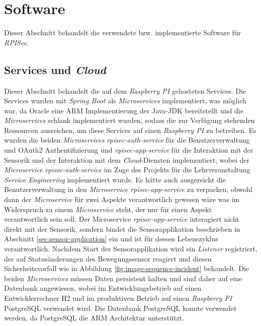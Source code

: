 \documentclass[]{article}
\begin{document}
\section{Software}
Dieser Abschnitt behandelt die verwendete bzw. implementierte Software für \emph{RPISec}.
\subsection{Services und \emph{Cloud}}
Dieser Abschnitt behandelt die auf dem \emph{Raspberry PI} gehosteten Services. Die Services wurden mit \emph{Spring Boot} als \emph{Microservices} implementiert, was möglich war, da Oracle eine ARM Implementierung der Java-JDK bereitstellt und die \emph{Microservices} schlank implementiert wurden, sodass die zur Verfügung stehenden Ressourcen ausreichen, um diese Services auf einen \emph{Raspberry PI} zu betreiben.
\newline
\newline
Es wurden die beiden \emph{Microservices} \emph{rpisec-auth-service} für die Benutzerverwaltung und OAuth2 Authentifizierung und \emph{rpisec-app-service} für die Interaktion mit der Sensorik und der Interaktion mit dem \emph{Cloud}-Diensten implementiert, wobei der \emph{Microservice} \emph{rpisec-auth-service} im Zuge des Projekts für die Lehrveranstaltung \emph{Service Engineering} implementiert wurde. Es hätte auch ausgereicht die Benutzerverwaltung in den \emph{Microservice rpisec-app-service} zu verpacken, obwohl dann der \emph{Microservice} für zwei Aspekte verantwortlich gewesen wäre was im Widerspruch zu einem \emph{Microservice} steht, der nur für einen Aspekt verantwortlich sein soll. 
\newline
\newline
Der Microservice \emph{rpisec-app-service} interagiert nicht direkt mit der Sensorik, sondern bindet die Sensorapplikation beschrieben in Abschnitt \ref{sec:sensor-application} ein und ist für dessen Lebenszyklus verantwortlich. Nachdem Start der Sensorapplikation wird ein \emph{Listener} registriert, der auf Statusänderungen des Bewegungssensor reagiert und diesen Sicherheitsvorfall wie in Abbildung \ref{fig:image-sequence-incident} behandelt.
\newline
\newline
Die beiden \emph{Microservices} müssen Daten persistent halten und sind daher auf eine Datenbank angewiesen, wobei im Entwicklungsbetrieb auf einen Entwicklerrechner H2 und im produktiven Betrieb auf einen \emph{Raspberry PI} PostgreSQL verwendet wird. Die Datenbank PostgreSQL konnte verwendet werden, da PostgreSQL die ARM Architektur unterstützt.
\end{document}
